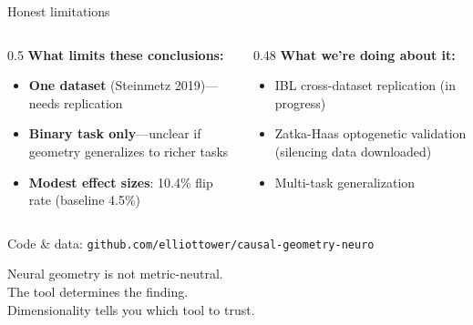 \documentclass[aspectratio=169,11pt]{beamer}
\begin{document}
\begin{frame}{Honest limitations}
\begin{columns}[T]
\begin{column}{0.5\textwidth}
\textbf{What limits these conclusions:}
\begin{itemize}
  \item \textbf{One dataset} (Steinmetz 2019)---needs replication
  \item \textbf{Binary task only}---unclear if geometry generalizes to richer tasks
  \item \textbf{Modest effect sizes}: 10.4\% flip rate (baseline 4.5\%)
\end{itemize}
\end{column}
\begin{column}{0.48\textwidth}
\textbf{What we're doing about it:}
\begin{itemize}
  \item IBL cross-dataset replication (in progress)
  \item Zatka-Haas optogenetic validation (silencing data downloaded)
  \item Multi-task generalization
\end{itemize}
\end{column}
\end{columns}
\end{frame}


\begin{frame}[standout]
  Code \& data: {\small \texttt{github.com/elliottower/causal-geometry-neuro}}

  \vspace{1em}
  Neural geometry is not metric-neutral.\\[0.3em]
  The tool determines the finding.\\[0.3em]
  Dimensionality tells you which tool to trust.
\end{frame}
\end{document}
